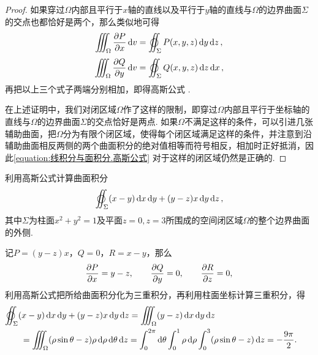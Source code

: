 \begin{theorem}
\begin{proof}
如果穿过\(\Omega\)内部且平行于\(x\)轴的直线以及平行于\(y\)轴的直线与\(\Omega\)的边界曲面\(\Sigma\)的交点也都恰好是两个，那么类似地可得\[
\iiint_{\Omega} \pdv{P}{x} \dd{v} = \varoiint_{\Sigma} P(x,y,z) \dd{y}\dd{z},
\]\[
\iiint_{\Omega} \pdv{Q}{y} \dd{v} = \varoiint_{\Sigma} Q(x,y,z) \dd{z}\dd{x},
\]再把以上三个式子两端分别相加，即得高斯公式 .

在上述证明中，我们对闭区域\(\Omega\)作了这样的限制，即穿过\(\Omega\)内部且平行于坐标轴的直线与\(\Omega\)的边界曲面\(\Sigma\)的交点恰好是两点.
如果\(\Omega\)不满足这样的条件，可以引进几张辅助曲面，把\(\Omega\)分为有限个闭区域，使得每个闭区域满足这样的条件，并注意到沿辅助曲面相反两侧的两个曲面积分的绝对值相等而符号相反，相加时正好抵消，因此\cref{equation:线积分与面积分.高斯公式} 对于这样的闭区域仍然是正确的.
\end{proof}
\end{theorem}


\begin{example}
利用高斯公式计算曲面积分\[
\varoiint_{\Sigma} (x-y) \dd{x}\dd{y} + (y-z)x \dd{y}\dd{z},
\]其中\(\Sigma\)为柱面\(x^2+y^2=1\)及平面\(z=0,z=3\)所围成的空间闭区域\(\Omega\)的整个边界曲面的外侧.
\begin{solution}
记\(P=(y-z)x\)，\(Q=0\)，\(R=x-y\)，那么\[
\pdv{P}{x} = y-z,
\qquad
\pdv{Q}{y} = 0,
\qquad
\pdv{R}{z} = 0,
\]利用高斯公式把所给曲面积分化为三重积分，再利用柱面坐标计算三重积分，得\begin{align*}
&\hspace{-20pt}\varoiint_{\Sigma} (x-y) \dd{x}\dd{y} + (y-z)x \dd{y}\dd{z}
= \iiint_{\Omega} (y-z) \dd{x}\dd{y}\dd{z} \\
&= \iiint_{\Omega} (\rho\sin\theta-z)\rho\dd{\rho}\dd{\theta}\dd{z}
= \int_0^{2\pi} \dd{\theta} \int_0^1 \rho\dd{\rho} \int_0^3 (\rho\sin\theta-z) \dd{z}
= -\frac{9\pi}{2}.
\end{align*}
\end{solution}
\end{example}

